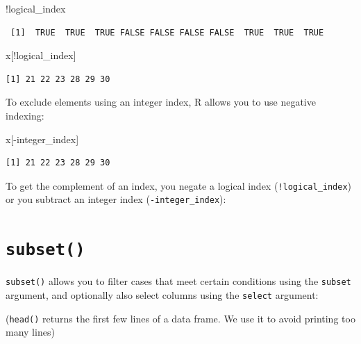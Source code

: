 \documentclass[
]{book}
\newenvironment{Shaded}{\begin{snugshade}}{\end{snugshade}}
\newcommand{\NormalTok}[1]{#1}
\newcommand{\SpecialCharTok}[1]{\textcolor[rgb]{0.00,0.00,0.00}{#1}}
\begin{document}
\begin{Shaded}
\begin{Highlighting}[]
\SpecialCharTok{!}\NormalTok{logical\_index}
\end{Highlighting}
\end{Shaded}

\begin{verbatim}
 [1]  TRUE  TRUE  TRUE FALSE FALSE FALSE FALSE  TRUE  TRUE  TRUE
\end{verbatim}

\begin{Shaded}
\begin{Highlighting}[]
\NormalTok{x[}\SpecialCharTok{!}\NormalTok{logical\_index]}
\end{Highlighting}
\end{Shaded}

\begin{verbatim}
[1] 21 22 23 28 29 30
\end{verbatim}

To exclude elements using an integer index, R allows you to use negative indexing:

\begin{Shaded}
\begin{Highlighting}[]
\NormalTok{x[}\SpecialCharTok{{-}}\NormalTok{integer\_index]}
\end{Highlighting}
\end{Shaded}

\begin{verbatim}
[1] 21 22 23 28 29 30
\end{verbatim}

\begin{rmdnote}
To get the complement of an index, you negate a logical index
(\texttt{!logical\_index}) or you subtract an integer index
(\texttt{-integer\_index}):
\end{rmdnote}

\hypertarget{subset}{%
\section{\texorpdfstring{\texttt{subset()}}{subset()}}\label{subset}}

\texttt{subset()} allows you to filter cases that meet certain conditions using the \texttt{subset} argument, and optionally also select columns using the \texttt{select} argument:

(\texttt{head()} returns the first few lines of a data frame. We use it to avoid printing too many lines)
\end{document}
